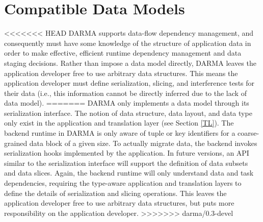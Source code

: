 
\section{Compatible Data Models}
<<<<<<< HEAD
\label{sec:datamodel}
\gls{DARMA} supports \gls{data-flow dependency} management, and consequently
must have some knowledge of the structure of application data in order to make
effective, efficient runtime dependency management and data staging decisions.  Rather
than impose a \gls{data model} directly, \gls{DARMA} leaves the application
developer free to use arbitrary data structures.  This means the application
developer must define \gls{serialization}, \gls{slicing}, and \glspl{interference test} for 
their data (i.e., this information cannot be directly inferred due to the lack
of \gls{data model}). 
=======
\label{sec:data_model}
DARMA only implements a data model through its serialization interface.
The notion of data structure, data layout, and data type only exist in the application and translation layer (see Section \ref{TL}).
The backend runtime in DARMA is only aware of tuple or key identifiers for a coarse-grained data block of a given size.
To actually migrate data, the backend invokes serialization hooks implemented by the application.
In future versions, an API similar to the serialization interface will support the definition of data subsets and data slices.
Again, the backend runtime will only understand data and task dependencies, requiring the type-aware application and translation layers to define the details of serialization and slicing operations.
This leaves the application developer free to use arbitrary data structures, but puts more responsibility on the application developer.
>>>>>>> darma/0.3-devel



